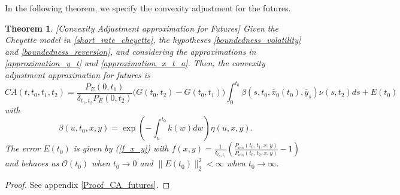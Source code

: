 \documentclass[a4paper,10pt]{article}
\newtheorem{theorem}{Theorem}[section]
\newcommand{\1}{\mathbf{1}}
\begin{document}
In the following theorem, we specify the convexity adjustment for the futures.

\begin{theorem}\label{Th_CA_futures}[Convexity Adjustment approximation for Futures]
Given the Cheyette model in \eqref{short_rate_cheyette}, the hypotheses \ref{boundedness_volatility} and \ref{boundedness_reversion}, and considering the approximations in \eqref{approximation_y_t} and \eqref{approximation_x_t_a}. Then, the convexity adjustment approximation for futures is 
\begin{equation}\label{ca_approximation_futures}
CA(t,t_0,t_1, t_2) = \frac{P_{E}(0,t_1)}{\delta_{t_1,t_2} P_{E}(0,t_2)} \biggl(G(t_0,t_2)  - G(t_0,t_1) \biggr) \int_{0}^{t_0} \beta(s,t_0,\bar{x}_0(t_0),\bar{y}_s) \nu(s,t_2) ds + E(t_0)
\end{equation}
with 
\begin{equation*}
\beta(u,t_0,x,y) = \exp\left(-\int_{u}^{t_0}k(w) dw \right) \eta(u,x,y).
\end{equation*}
The error $E(t_0)$ is given by (\ref{f_x_y}) with $f(x,y)=\frac{1}{\delta_{t_0,t_1}}\left(\frac{P_{ois}(t_0,t_1,x,y)}{P_{ois}(t_0,t_2,x,y)} -1\right)$ and behaves as $\mathcal{O}(t_0)$ when $t_0 \to 0$ and $\|E(t_0)\|^{2}_{2} < \infty$ when $t_0 \to \infty$. 
\end{theorem}
\begin{proof}
See appendix \ref{Proof_CA_futures}.
\end{proof}
\end{document}
